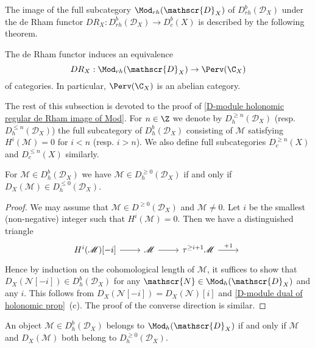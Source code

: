 The image of the full subcategory $\Mod_{rh}(\mathscr{D}_X)$ of $D^b_{rh}(\mathscr{D}_X)$ under the de Rham functor $DR_X:D^b_{rh}(\mathscr{D}_X)\to D^b_c(X)$ is described by the following theorem.

\begin{theorem}\label{D-module holonomic regular de Rham image of Mod}
The de Rham functor induces an equivalence
\[DR_X:\Mod_{rh}(\mathscr{D}_X)\to \Perv(\C_X)\]
of categories. In particular, $\Perv(\C_X)$ is an abelian category.
\end{theorem}

The rest of this subsection is devoted to the proof of \cref{D-module holonomic regular de Rham image of Mod}. For $n\in\Z$ we denote by $D^{\geq n}_h(\mathscr{D}_X)$ (resp. $D^{\leq n}_h(\mathscr{D}_X)$) the full subcategory of $D^b_h(\mathscr{D}_X)$ consisting of $\mathscr{M}$ satisfying $H^i(\mathscr{M})=0$ for $i<n$ (resp. $i>n$). We also define full subcategories $D^{\geq n}_c(X)$ and $D^{\leq n}_c(X)$ similarly.

\begin{lemma}\label{D-module holonomic regular D^geq 0 and dual}
For $\mathscr{M}\in D^b_h(\mathscr{D}_X)$ we have $\mathscr{M}\in D^{\geq 0}_h(\mathscr{D}_X)$ if and only if $D_X(\mathscr{M})\in D^{\leq 0}_h(\mathscr{D}_X)$.
\end{lemma}
\begin{proof}
We may assume that $\mathscr{M}\in D^{\geq 0}(\mathscr{D}_X)$ and $\mathscr{M}\neq 0$. Let $i$ be the smallest (non-negative) integer such that $H^i(\mathscr{M})=0$. Then we have a distinguished triangle
\[\begin{tikzcd}
H^i(\mathscr{M})[-i]\ar[r]&\mathscr{M}\ar[r]&\tau^{\geq i+1}\mathscr{M}\ar[r,"+1"]&{}
\end{tikzcd}
\]
Hence by induction on the cohomological length of $\mathscr{M}$, it suffices to show that $D_X(\mathscr{N}[-i])\in D^b_h(\mathscr{D}_X)$ for any $\mathscr{N}\in\Mod_h(\mathscr{D}_X)$ and any $i$. This follows from $D_X(\mathscr{N}[-i])=D_X(\mathscr{N})[i]$ and \cref{D-module dual of holonomic prop}~(c). The proof of the converse direction is similar.
\end{proof}

\begin{corollary}\label{D-module holonomic regular derived heart char by duality}
An object $\mathscr{M}\in D^b_h(\mathscr{D}_X)$ belongs to $\Mod_h(\mathscr{D}_X)$ if and only if $\mathscr{M}$ and $D_X(\mathscr{M})$ both belong to $D^{\geq 0}_h(\mathscr{D}_X)$.
\end{corollary}

